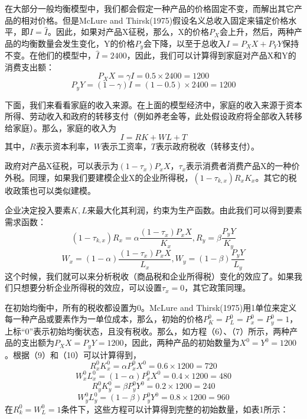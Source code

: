 \documentclass[cn,12pt,math=newtx,citestyle=gb7714-2015,bibstyle=gb7714-2015]{elegantbook}
\begin{document}
	在大部分一般均衡模型中，我们都会假定一种产品的价格固定不变，而解出其它产品的相对价格。但是McLure and Thirsk(1975)假设名义总收入固定来锚定价格水平，即$I=\hat{I}$。因此，如果对产品X征税，那么，X的价格$P_X$会上升，然后，两种产品的均衡数量会发生变化，Y的价格$P_y$会下降，以至于总收入$I=P_XX+P_YY$保持不变。在他们的模型中，$\hat{I}=2400$，因此，我们可以计算得到家庭对产品X和Y的消费支出额：
	\begin{equation}
		P_XX=\gamma I=0.5 \times 2400=1200
	\end{equation}
	\begin{equation}
		P_yY=(1-\gamma) I=(1-0.5) \times 2400=1200
	\end{equation}
	
	下面，我们来看看家庭的收入来源。在上面的模型经济中，家庭的收入来源于资本所得、劳动收入和政府的转移支付（例如养老金等，此处假设政府将全部收入转移给家庭）。那么，家庭的收入为
	\begin{equation}
		I=RK+WL+T
	\end{equation}
	其中，$R$表示资本利率，$W$表示工资率，$T$表示政府税收（转移支付）。
	
	政府对产品X征税，可以表示为$(1-\tau_x)P_xX$，$\tau_x$表示消费者消费产品X的一种价外税。同理，如果我们要建模企业X的企业所得税，$(1-\tau_{k,x})R_xK_x$。其它的税收政策也可以类似建模。
	
	企业决定投入要素$K,L$来最大化其利润，约束为生产函数。由此我们可以得到要素需求函数：
	\begin{equation}
		(1-\tau_{k,x})R_x=\alpha \frac{(1-\tau_x)P_xX}{K_x},R_y=\beta \frac{P_yY}{K_y}
	\end{equation}
	\begin{equation}
		W_x=(1-\alpha) \frac{(1-\tau_x)P_xX}{L_x},W_y=(1-\beta) \frac{P_yY}{L_y}
	\end{equation}
	这个时候，我们就可以来分析税收（商品税和企业所得税）变化的效应了。如果我们只想要分析企业所得税的效应，可以设置$\tau_x=0$，其它政策同理。
	
	在初始均衡中，所有的税收都设置为0。McLure and Thirsk(1975)用1单位来定义每一种产品或要素作为一单位成本，那么，初始的价格$P_K^0=P_L^0=P_x^0=P_y^0=1$，上标“0”表示初始均衡状态，且没有税收。那么，如方程（6）、（7）所示，两种产品的支出额为$P_XX=P_yY=1200$，因此，两种产品的初始数量为$X^0=Y^0=1200$。根据（9）和（10）可以计算得到，
	\begin{equation}
		R_x^0K_x^0=\alpha P_x^0X^0=0.6 \times 1200=720
	\end{equation}
	\begin{equation}
		W_x^0L_x^0=(1-\alpha) P_x^0X^0=0.4 \times 1200=480
	\end{equation}
	\begin{equation}
		R_y^0K_y^0=\beta P_y^0Y^0=0.2 \times 1200=240
	\end{equation}
	\begin{equation}
		W_y^0L_y^0=(1-\beta) P_y^0Y^0=0.8 \times 1200=960
	\end{equation}
	在$R_k^0=W_L^0=1$条件下，这些方程可以计算得到完整的初始数量，如表1所示：
	
\end{document}
